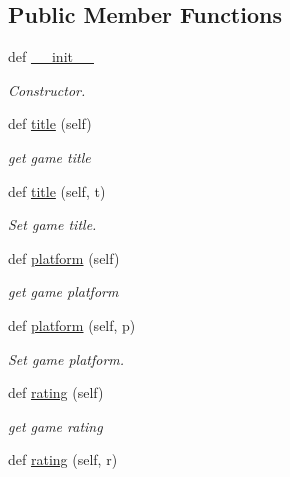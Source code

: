 \subsection*{Public Member Functions}
\begin{DoxyCompactItemize}
\item 
def \hyperlink{classbridges_1_1data__src__dependent_1_1game_1_1_game_aeeaed2287f616f6ec9ff8c2bd6f07835}{\+\_\+\+\_\+init\+\_\+\+\_\+}
\begin{DoxyCompactList}\small\item\em Constructor. \end{DoxyCompactList}\item 
def \hyperlink{classbridges_1_1data__src__dependent_1_1game_1_1_game_a05838d85c567aa7ece895ca34ef2051b}{title} (self)
\begin{DoxyCompactList}\small\item\em get game title \end{DoxyCompactList}\item 
def \hyperlink{classbridges_1_1data__src__dependent_1_1game_1_1_game_ae2b0f2f1bbbf2d11c669079b075c6ad1}{title} (self, t)
\begin{DoxyCompactList}\small\item\em Set game title. \end{DoxyCompactList}\item 
def \hyperlink{classbridges_1_1data__src__dependent_1_1game_1_1_game_a6ded3cef2be4f19c8775f1b6c760d2d5}{platform} (self)
\begin{DoxyCompactList}\small\item\em get game platform \end{DoxyCompactList}\item 
def \hyperlink{classbridges_1_1data__src__dependent_1_1game_1_1_game_ac7b692ca0b04271799d5bdd5117e3102}{platform} (self, p)
\begin{DoxyCompactList}\small\item\em Set game platform. \end{DoxyCompactList}\item 
def \hyperlink{classbridges_1_1data__src__dependent_1_1game_1_1_game_a232bceb05cb6b595350deedb7091573b}{rating} (self)
\begin{DoxyCompactList}\small\item\em get game rating \end{DoxyCompactList}\item 
def \hyperlink{classbridges_1_1data__src__dependent_1_1game_1_1_game_a132b50aaeb278283c91e71baafcd7510}{rating} (self, r)

\end{DoxyCompactItemize}
